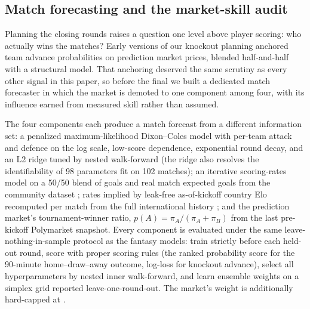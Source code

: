 \subsection{Match forecasting and the market-skill audit}
\label{sec:analysis-forecast}

Planning the closing rounds raises a question one level above player
scoring: who actually wins the matches? Early versions of our
knockout planning anchored team advance probabilities on prediction
market prices, blended half-and-half with a structural model. That
anchoring deserved the same scrutiny as every other signal in this
paper, so before the final we built a dedicated match forecaster in
which the market is demoted to one component among four, with its
influence earned from measured skill rather than assumed.

The four components each produce a match forecast from a different
information set: a penalized maximum-likelihood Dixon--Coles model
\citep{dixon1997modelling} with per-team attack and defence on the
log scale, low-score dependence, exponential round decay, and an L2
ridge tuned by nested walk-forward (the ridge also resolves the
identifiability of 98 parameters fit on 102 matches); an iterative
scoring-rates model on a 50/50 blend of goals and real match
expected goals from the community dataset
\citep{mominul2026dataset}; rates implied by leak-free as-of-kickoff
country Elo recomputed per match from the full international history
\citep{martj42}; and the prediction market's tournament-winner
ratio, $p(A) = \pi_A / (\pi_A + \pi_B)$ from the last pre-kickoff
Polymarket snapshot. Every component is evaluated under the same
leave-nothing-in-sample protocol as the fantasy models: train
strictly before each held-out round, score with proper scoring rules
(the ranked probability score for the 90-minute home--draw--away
outcome, log-loss for knockout advance), select all hyperparameters
by nested inner walk-forward, and learn ensemble weights on a
simplex grid reported leave-one-round-out. The market's weight is
additionally hard-capped at \ForecastMarketCap{}.

